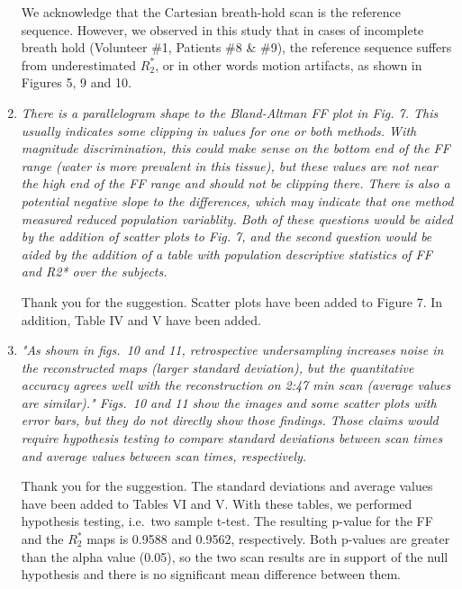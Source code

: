\documentclass[a4paper,11pt]{report}
\begin{document}
\begin{enumerate}
\hspace{1em} We acknowledge that the Cartesian breath-hold scan is the reference sequence. 
However, we observed in this study that in cases of incomplete breath hold 
(Volunteer \#1, Patients \#8 \& \#9), 
the reference sequence suffers from underestimated $R_2^*$, or in other words motion artifacts, 
as shown in Figures 5, 9 and 10.

	\item \textit{There is a parallelogram shape to the Bland-Altman FF plot in Fig. 7. This usually indicates some clipping in values for one or both methods. With magnitude discrimination, this could make sense on the bottom end of the FF range (water is more prevalent in this tissue), but these values are not near the high end of the FF range and should not be clipping there. There is also a potential negative slope to the differences, which may indicate that one method measured reduced population variablity. Both of these questions would be aided by the addition of scatter plots to Fig. 7, and the second question would be aided by the addition of a table with population descriptive statistics of FF and R2* over the subjects.}

\hspace{1em} Thank you for the suggestion. 
Scatter plots have been added to Figure 7. In addition, Table IV and V have been added.

	\item \textit{"As shown in figs.~10 and 11, retrospective undersampling increases noise in the reconstructed maps (larger standard deviation), but the quantitative accuracy agrees well with the reconstruction on 2:47 min scan (average values are similar)." Figs.~10 and 11 show the images and some scatter plots with error bars, but they do not directly show those findings. Those claims would require hypothesis testing to compare standard deviations between scan times and average values between scan times, respectively.}

\hspace{1em} Thank you for the suggestion. 
The standard deviations and average values have been added to Tables VI and V. 
With these tables, we performed hypothesis testing, i.e.~two sample t-test. 
The resulting p-value for the FF and the $R_2^*$ maps is 0.9588 and 0.9562, respectively.
Both p-values are greater than the alpha value (0.05), 
so the two scan results are in support of the null hypothesis 
and there is no significant mean difference between them.


\end{enumerate}
\end{document}
